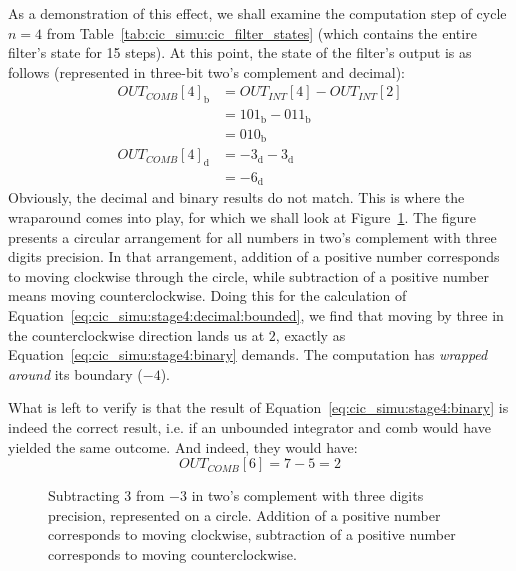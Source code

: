 As a  demonstration of this effect,  we shall examine the  computation step of
cycle $n = 4$  from Table~\ref{tab:cic_simu:cic_filter_states} (which contains
the  entire filter's  state for  15 steps). At  this point,  the state  of the
filter's output is  as follows (represented in three-bit  two's complement and
decimal):
\begin{align}
    OUT_{COMB}[4]_\mathrm{b} &= OUT_{INT}[4] - OUT_{INT}[2]     \nonumber\\
                             &= 101_\mathrm{b} - 011_\mathrm{b} \nonumber\\
                             &= 010_\mathrm{b}
    \label{eq:cic_simu:stage4:binary} \\
    OUT_{COMB}[4]_\mathrm{d} &= -3_\mathrm{d} - 3_\mathrm{d}    \nonumber\\
                             &= -6_\mathrm{d}
    \label{eq:cic_simu:stage4:decimal:bounded}
\end{align}
Obviously,   the  decimal   and   binary  results   do   not  match. This   is
where   the  wraparound   comes   into   play,  for   which   we  shall   look
at  Figure~\ref{fig:cic_simu:twos_complement_circle}. The  figure  presents  a
circular  arrangement  for   all  numbers  in  two's   complement  with  three
digits  precision.   In  that  arrangement,  addition  of  a  positive  number
corresponds to  moving clockwise  through the circle,  while subtraction  of a
positive number means moving  counterclockwise. Doing this for the calculation
of  Equation~\ref{eq:cic_simu:stage4:decimal:bounded},  we  find  that  moving
by  three  in  the  counterclockwise   direction  lands  us  at  $2$,  exactly
as   Equation~\ref{eq:cic_simu:stage4:binary}  demands. The   computation  has
\emph{wrapped around} its boundary ($-4$).

What     is     left    to     verify     is     that    the     result     of
Equation~\ref{eq:cic_simu:stage4:binary} is indeed the correct result, i.e. if
an  unbounded integrator  and comb  would have  yielded the  same outcome. And
indeed, they would have:
\begin{equation}
    \label{eq:cic_simu:stage4:decimal:unbounded}
    OUT_{COMB}[6] = 7 - 5 = 2
\end{equation}

\begin{figure}
    \centering
    
    \caption[Two's Complement Circle]{%
        Subtracting  $3$  from $-3$  in  two's  complement with  three  digits
        precision,  represented on  a  circle. Addition of  a positive  number
        corresponds  to moving  clockwise,  subtraction of  a positive  number
        corresponds to moving counterclockwise.%
    }
    \label{fig:cic_simu:twos_complement_circle}
\end{figure}


